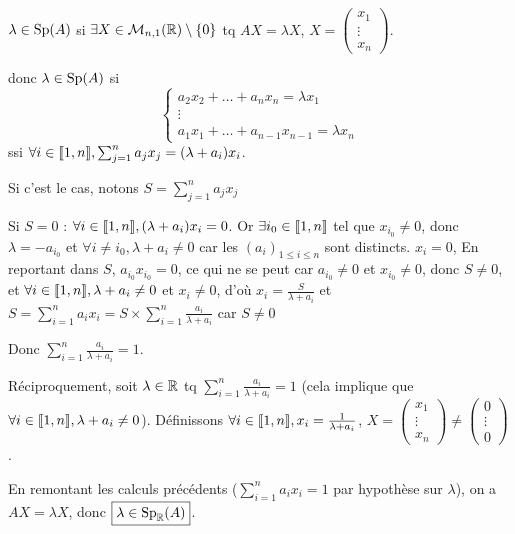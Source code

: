 \begin{solution}
$\lambda \in \operatorname{Sp}(A)$ si $\exists X \in \mathcal M_{n,1}(\mathbb R) \setminus \{0\}$ tq $AX = \lambda X$, $X = \begin{pmatrix} x_1 \\ \vdots \\ x_n \end{pmatrix}$.

donc $\lambda \in \operatorname{Sp}(A)$ si
\[
\begin{cases}
a_2 x_2 + \dots + a_n x_n = \lambda x_1 \\
\vdots \\
a_1 x_1 + \dots + a_{n-1} x_{n-1} = \lambda x_n
\end{cases}
\]
ssi $\forall i \in \llbracket 1,n\rrbracket, \sum_{j=1}^n a_j x_j = (\lambda + a_i) x_i$.

Si c'est le cas, notons $S = \sum_{j=1}^n a_j x_j$

Si $S = 0$ :
$\forall i \in \llbracket 1,n\rrbracket, (\lambda + a_i) x_i = 0$.
Or $\exists i_0 \in \llbracket 1,n\rrbracket$ tel que $x_{i_0} \neq 0$, donc $\lambda = -a_{i_0}$ et $\forall i \neq i_0, \lambda + a_i \neq 0$ car les $(a_i)_{1 \leq i \leq n}$ sont distincts.
$x_i = 0$, En reportant dans $S$, $a_{i_0} x_{i_0} = 0$, ce qui ne se peut car $a_{i_0} \neq 0$ et $x_{i_0} \neq 0$, donc $S \neq 0$,
et $\forall i \in \llbracket 1,n\rrbracket, \lambda + a_i \neq 0$ et $x_i \neq 0$, d'où $x_i = \frac{S}{\lambda + a_i}$
et $S = \sum_{i=1}^n a_i x_i = S \times \sum_{i=1}^n \frac{a_i}{\lambda + a_i}$ car $S \neq 0$

Donc $\boxed{\sum_{i=1}^n \frac{a_i}{\lambda + a_i} = 1}$.

Réciproquement, soit $\lambda \in \mathbb R$ tq $\sum_{i=1}^n \frac{a_i}{\lambda + a_i} = 1$ (cela implique que $\forall i \in \llbracket 1,n\rrbracket, \lambda + a_i \neq 0$).
Définissons $\forall i \in \llbracket 1,n\rrbracket, x_i = \frac{1}{\lambda + a_i}$, $X = \begin{pmatrix} x_1 \\ \vdots \\ x_n \end{pmatrix} \neq \begin{pmatrix} 0 \\ \vdots \\ 0 \end{pmatrix}$.

En remontant les calculs précédents ($\sum_{i=1}^n a_i x_i = 1$ par hypothèse sur $\lambda$), on a $AX = \lambda X$, donc $\boxed{\lambda \in \operatorname{Sp}_\mathbb R(A)}$.


\end{solution}
